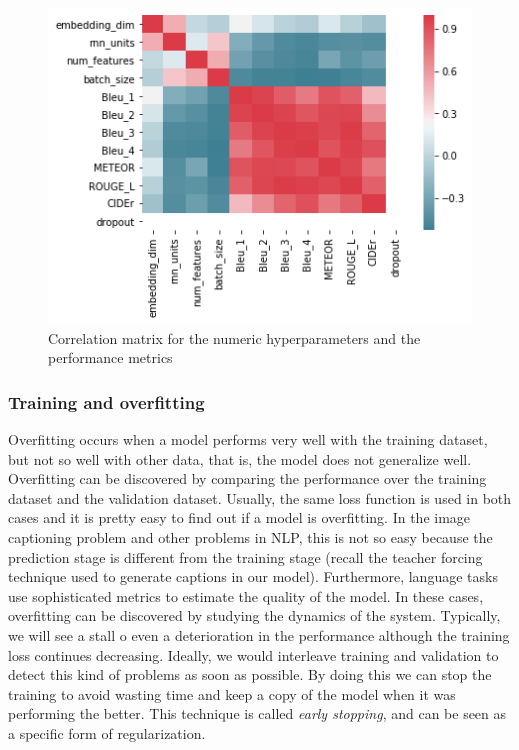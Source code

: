 \begin{figure}[hpt]
    \centering
    \includegraphics[scale=0.7]{images/ch5/correlation_matrix.png}
    \caption{Correlation matrix for the numeric hyperparameters and the performance metrics}
    \label{fig:correlation_matrix}
\end{figure}

\subsubsection{Training and overfitting}

Overfitting occurs when a model performs very well with the training dataset, but not so well with other data, that is, the model does not generalize well.
Overfitting can be discovered by comparing the performance over the training dataset and the validation dataset. Usually, the same loss function is used in both cases and it is pretty easy to find out if a model is overfitting. In the image captioning problem and other problems in NLP, this is not so easy because the prediction stage is different from the training stage (recall the teacher forcing technique used to generate captions in our model). Furthermore, language tasks use sophisticated metrics to estimate the quality of the model. In these cases, overfitting can be discovered by studying the dynamics of the system. Typically, we will see a stall o even a deterioration in the performance although the training loss continues decreasing. Ideally, we would interleave training and validation to detect this kind of problems as soon as possible. By doing this we can stop the training to avoid wasting time and keep a copy of the model when it was performing the better. This technique is called \textit{early stopping}, and can be seen as a specific form of regularization. 

